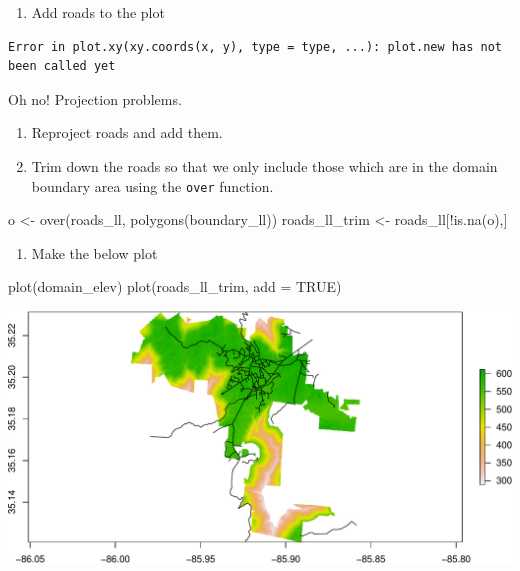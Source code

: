 \documentclass[
]{book}
\newenvironment{Shaded}{\begin{snugshade}}{\end{snugshade}}
\newcommand{\AttributeTok}[1]{\textcolor[rgb]{0.77,0.63,0.00}{#1}}
\newcommand{\ConstantTok}[1]{\textcolor[rgb]{0.00,0.00,0.00}{#1}}
\newcommand{\FunctionTok}[1]{\textcolor[rgb]{0.00,0.00,0.00}{#1}}
\newcommand{\NormalTok}[1]{#1}
\newcommand{\OtherTok}[1]{\textcolor[rgb]{0.56,0.35,0.01}{#1}}
\newcommand{\SpecialCharTok}[1]{\textcolor[rgb]{0.00,0.00,0.00}{#1}}
\providecommand{\tightlist}{%
  \setlength{\itemsep}{0pt}\setlength{\parskip}{0pt}}
\begin{document}
\begin{enumerate}
\def\labelenumi{\arabic{enumi}.}
\setcounter{enumi}{23}
\tightlist
\item
  Add roads to the plot
\end{enumerate}

\begin{verbatim}
Error in plot.xy(xy.coords(x, y), type = type, ...): plot.new has not been called yet
\end{verbatim}

Oh no! Projection problems.

\begin{enumerate}
\def\labelenumi{\arabic{enumi}.}
\setcounter{enumi}{24}
\item
  Reproject roads and add them.
\item
  Trim down the roads so that we only include those which are in the domain boundary area using the \texttt{over} function.
\end{enumerate}

\begin{Shaded}
\begin{Highlighting}[]
\NormalTok{o }\OtherTok{\textless{}{-}} \FunctionTok{over}\NormalTok{(roads\_ll, }\FunctionTok{polygons}\NormalTok{(boundary\_ll))}
\NormalTok{roads\_ll\_trim }\OtherTok{\textless{}{-}}\NormalTok{ roads\_ll[}\SpecialCharTok{!}\FunctionTok{is.na}\NormalTok{(o),]}
\end{Highlighting}
\end{Shaded}

\begin{enumerate}
\def\labelenumi{\arabic{enumi}.}
\setcounter{enumi}{26}
\tightlist
\item
  Make the below plot
\end{enumerate}

\begin{Shaded}
\begin{Highlighting}[]
\FunctionTok{plot}\NormalTok{(domain\_elev)}
\FunctionTok{plot}\NormalTok{(roads\_ll\_trim, }\AttributeTok{add =} \ConstantTok{TRUE}\NormalTok{)}
\end{Highlighting}
\end{Shaded}

\includegraphics{figures/unnamed-chunk-435-1.pdf}
\end{document}
